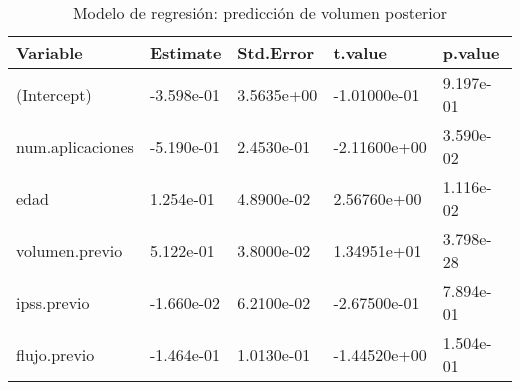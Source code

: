 \begin{table}[ht]
\centering
\caption{Modelo de regresión: predicción de volumen posterior} 
\label{tab:modelo_volumen}
\begin{tabular}{lllll}
  \hline
Variable & Estimate & Std.Error & t.value & p.value \\ 
  \hline
(Intercept) & -3.598e-01 & 3.5635e+00 & -1.01000e-01 & 9.197e-01 \\ 
  num.aplicaciones & -5.190e-01 & 2.4530e-01 & -2.11600e+00 & 3.590e-02 \\ 
  edad &  1.254e-01 & 4.8900e-02 &  2.56760e+00 & 1.116e-02 \\ 
  volumen.previo &  5.122e-01 & 3.8000e-02 &  1.34951e+01 & 3.798e-28 \\ 
  ipss.previo & -1.660e-02 & 6.2100e-02 & -2.67500e-01 & 7.894e-01 \\ 
  flujo.previo & -1.464e-01 & 1.0130e-01 & -1.44520e+00 & 1.504e-01 \\ 
   \hline
\end{tabular}
\end{table}
